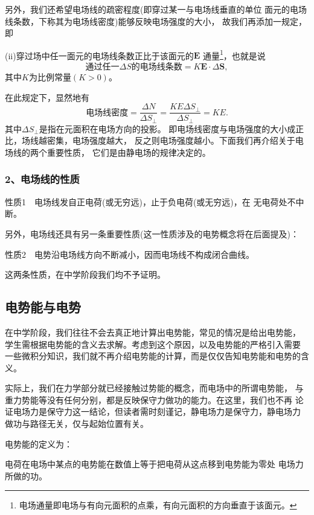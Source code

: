 另外，我们还希望电场线的疏密程度(即穿过某一与电场线垂直的单位
面元的电场线条数，下称其为电场线密度)能够反映电场强度的大小，
故我们再添加一规定，即

(ii)穿过场中任一面元的电场线条数正比于该面元的$\boldsymbol{E}$
通量\footnote{
    电场通量即电场与有向元面积的点乘，有向元面积的方向垂直于该面元。
}，也就是说
\begin{equation}
    \text{通过任一}\Delta S\text{的电场线条数}=
    K\boldsymbol{E}\cdot \Delta \boldsymbol{S},
\end{equation}
其中$K$为比例常量$(K>0)$。

在此规定下，显然地有
\begin{equation}
    \text{电场线密度}=\frac{\Delta N}{\Delta S_\bot }
    =\frac{KE\Delta S_\bot}{\Delta S_\bot }=KE.
\end{equation}
其中$\Delta S_\bot$是指在元面积在电场方向的投影。
即电场线密度与电场强度的大小成正比，场线越密集，电场强度越大，
反之则电场强度越小。下面我们再介绍关于电场线的两个重要性质，
它们是由静电场的规律决定的。
\subsubsection*{2、电场线的性质}
\begin{theorem}
    性质1~~电场线发自正电荷(或无穷远)，止于负电荷(或无穷远)，在 
    无电荷处不中断。
    
    另外，电场线还具有另一条重要性质(这一性质涉及的电势概念将在后面提及)：

    性质2~~电势沿电场线方向不断减小，因而电场线不构成闭合曲线。
\end{theorem}

这两条性质，在中学阶段我们均不予证明。
\subsection{电势能与电势}
在中学阶段，我们往往不会去真正地计算出电势能，常见的情况是给出电势能，
学生需根据电势能的含义去求解。考虑到这个原因，以及电势能的严格引入需要
一些微积分知识，我们就不再介绍电势能的计算，而是仅仅告知电势能和电势的含义。

实际上，我们在力学部分就已经接触过势能的概念，而电场中的所谓电势能，
与重力势能等没有任何分别，都是反映保守力做功的能力。在这里，我们也不再
论证电场力是保守力这一结论，但读者需时刻谨记，静电场力是保守力，静电场力 
做功与路径无关，仅与起始位置有关。

电势能的定义为：
\begin{definition}
    电荷在电场中某点的电势能在数值上等于把电荷从这点移到电势能为零处
    电场力所做的功。
\end{definition}

